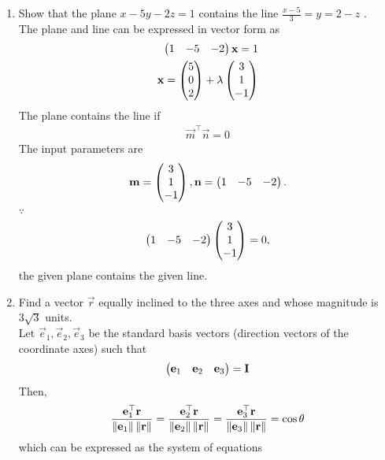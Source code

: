 \documentclass[journal,12pt,twocolumn]{IEEEtran}
\renewcommand\thesection{\arabic{section}}
\begin{document}
\begin{enumerate}[label=\thesection.\arabic*.,ref=\thesection.\theenumi]
\item Show that the plane $ x-5y-2z=1 $ contains the line $ \frac{x-5}{3}=y=2-z $ .\\
	\solution The plane and line can be expressed in vector form as
  \begin{align}
	  \label{eq:line_plane_contain_plane}
	  \begin{pmatrix}1 & -5 & -2\end{pmatrix}\mathbf{x}=1 
	  \\
	  \mathbf{x} = \begin{pmatrix}5 \\ 0 \\ 2\end{pmatrix} + \lambda \begin{pmatrix}3 \\ 1 \\ -1\end{pmatrix}
	  \label{eq:line_plane_containline}
  \end{align}
The plane contains the line if 
  \begin{align}
	  \vec{m}^{\top}\vec{n} = 0
  \end{align}
  The input parameters are 
  \begin{align}
	  \mathbf{m} = \begin{pmatrix}3 \\ 1 \\ -1\end{pmatrix},
	 \mathbf{n} = \begin{pmatrix}1 & -5 & -2\end{pmatrix}.
  \end{align}
  $\because$
  \begin{align}
	  \begin{pmatrix}1 & -5 & -2\end{pmatrix}\begin{pmatrix}3 \\ 1 \\ -1\end{pmatrix} = 0,
	  \label{eq:line_plane_containline_sol}
  \end{align}
the given plane contains the given line.
\item  Find a vector $\overrightarrow{r}$ equally inclined to the three axes and whose magnitude is $3\sqrt{3}$ units.   
	\\
	\solution  Let $\vec{e}_1, \vec{e}_2, \vec{e}_3$ be the standard basis vectors (direction vectors of the coordinate axes) such that
  \begin{align}
	  \begin{pmatrix}\mathbf{e}_1 & \mathbf{e}_2 &\mathbf{e}_3\end{pmatrix} = \mathbf{I}
  \end{align}
  Then, 
  \begin{align}
	  \frac{\mathbf{e}_1^{\top} \mathbf{r}}{\left\lVert\mathbf{e}_1\right\rVert\left\lVert\mathbf{r}\right\rVert} = 
	  \frac{\mathbf{e}_2^{\top} \mathbf{r}}{\left\lVert\mathbf{e}_2\right\rVert\left\lVert\mathbf{r}\right\rVert} = 
	  \frac{\mathbf{e}_3^{\top} \mathbf{r}}{\left\lVert\mathbf{e}_3\right\rVert\left\lVert\mathbf{r}\right\rVert} = \cos \theta
  \end{align}
  which can be expressed as the system of equations

\end{enumerate}
\end{document}
